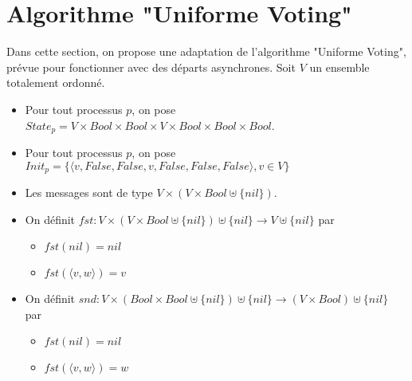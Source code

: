 \documentclass{article}
\begin{document}
\section{Algorithme "Uniforme Voting"}

Dans cette section, on propose une adaptation de l'algorithme  "Uniforme Voting", prévue pour fonctionner avec des départs asynchrones.
Soit $V$ un ensemble totalement ordonné.

\begin{itemize}

	\item Pour tout processus $p$, on pose
		$State_p = V \times Bool \times Bool \times V \times Bool \times Bool \times Bool$.
	\item Pour tout processus $p$, on pose
		$Init_p = \{\langle v, False, False, v, False, False, False \rangle, v \in V\}$
	\item Les messages sont de type $V \times (V \times Bool \uplus \{nil\})$.


	\item On définit $fst : V \times (V \times Bool \uplus \{nil\}) \uplus \{nil\} \rightarrow V \uplus \{nil\}$ par
	\begin{itemize}
		\item $fst(nil) = nil$
		\item $fst(\langle v, w \rangle) = v$
	\end{itemize}

	\item On définit $snd : V \times (Bool \times Bool \uplus \{nil\}) \uplus \{nil\} \rightarrow (V \times Bool) \uplus \{nil\}$ par
	\begin{itemize}
		\item $fst(nil) = nil$
		\item $fst(\langle v, w \rangle) = w$
	\end{itemize}
\end{itemize}
\end{document}
